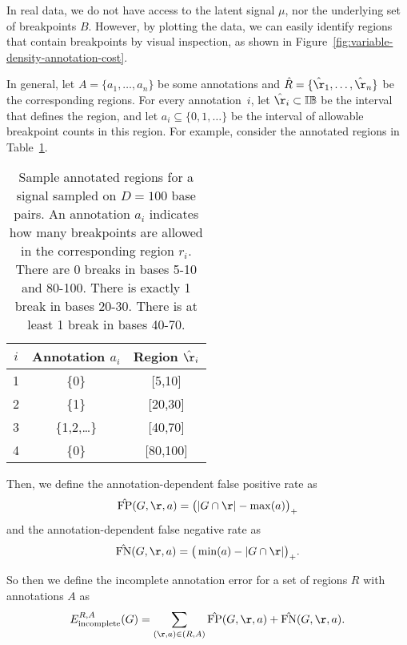 \documentclass{article}
\begin{document}
In real data, we do not have access to the latent signal $\mu$, nor
the underlying set of breakpoints $B$. However, by
plotting the data, we can easily identify regions that contain
breakpoints by visual inspection, as shown in
Figure~\ref{fig:variable-density-annotation-cost}.

In general, let $A=\{a_1,\dots,a_n\}$ be some annotations and $\hat
R=\{\hat \r_1,\dots,\hat \r_n\}$ be the corresponding regions. For
every annotation~$i$, let $\hat\r_i\subset\mathbb I\mathbb B$ be the
interval that defines the region, and let $a_i\subseteq\{0,1,\dots\}$
be the interval of allowable breakpoint counts in this region. For
example, consider the annotated regions in
Table~\ref{tab:sample_annotations}.

\begin{table}[b!]
  \begin{center}
    \begin{tabular}{ccc}
  $i$ & Annotation $a_i$ & Region $\hat \r_i$\\
\hline
1 & \{0\} & [5,10]\\
2 & \{1\} & [20,30]\\
3 & \{1,2,\dots\} & [40,70]\\
4 & \{0\} & [80,100]
\end{tabular}
  \end{center}
  \caption{Sample annotated regions for a signal sampled on $D=100$ base pairs. 
    An annotation $a_i$ indicates how many breakpoints are allowed in the corresponding region $r_i$.
    There are 0 breaks in bases 5-10 and 80-100.
    There is exactly 1 break in bases 20-30.
    There is at least 1 break in bases 40-70.}
  \label{tab:sample_annotations}
\end{table}




Then, we define the annotation-dependent false positive rate as
\begin{equation}
  \label{eq:FP_hat}
  \hat{ \text{FP}}(G,\r,a) =
    \big( 
|G\cap\r|-\max(a)
\big)_+
\end{equation}
and the annotation-dependent false negative rate as
\begin{equation}
  \label{eq:FN_hat}
  \hat{ \text{FN}}(G,\r,a) =
  \big(
\min(a)-|G\cap\r|
\big)_+.
\end{equation}

So then we define the incomplete annotation error for a set of
regions $R$ with annotations $A$ as
\begin{equation}
  \label{eq:incomplete}
  E^{R,A}_{\text{incomplete}}(G)=
    \sum_{(\r,a)\in(R,A)} \hat{\text{FP}}(G,\r,a) + \hat{\text{FN}}(G,\r,a).
\end{equation}
\end{document}

